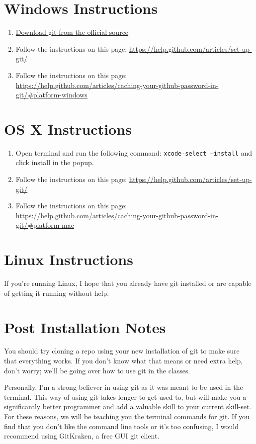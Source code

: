 \documentclass[11pt,fleqn]{article}
\begin{document}
\section*{Windows Instructions}
\begin{enumerate}
    \item
        \href{https://git-scm.com/download/win}{Download git from the official source}

    \item
        Follow the instructions on this page: \url{https://help.github.com/articles/set-up-git/}

    \item
       Follow the instructions on this page: \url{https://help.github.com/articles/caching-your-github-password-in-git/#platform-windows}

\end{enumerate}

\section*{OS X Instructions}
\begin{enumerate}
    \item
        Open terminal and run the following command: \texttt{xcode-select --install} and click
        install in the popup. 

    \item
        Follow the instructions on this page: \url{https://help.github.com/articles/set-up-git/}

    \item
       Follow the instructions on this page:
        \url{https://help.github.com/articles/caching-your-github-password-in-git/#platform-mac}

 \end{enumerate}

 \section*{Linux Instructions}
 If you're running Linux, I hope that you already have git installed or are capable of getting it
 running without help. 

 \section*{Post Installation Notes}
 You should try cloning a repo using your new installation of git to make sure that everything
 works. If you don't know what that means or need extra help, don't worry; we'll be going over how
 to use git in the classes. 

 Personally, I'm a strong believer in using git as it was meant to be used in the terminal. This
 way of using git takes longer to get used to, but will make you a significantly better programmer
 and add a valuable skill to your current skill-set. For these reasons, we will be teaching you the
 terminal commands for git. If you find that you don't like the command line tools or it's too
 confusing, I would recommend using GitKraken, a free GUI git client. 
\end{document}
